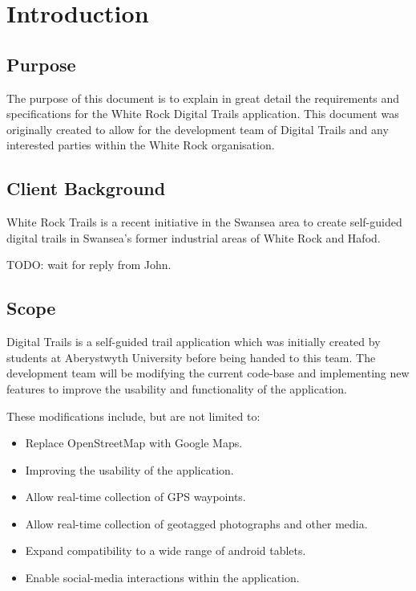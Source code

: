 \documentclass[11pt,a4paper]{article}
\begin{document}


\newpage 

\tableofcontents

\newpage
\section{Introduction}
\subsection{Purpose}
\label{sec:purpose}
The purpose of this document is to explain in great detail the requirements and specifications for the White Rock Digital Trails application. This document was originally created to allow for the development team of Digital Trails and any interested parties within the White Rock organisation.

\subsection{Client Background}
\label{sec:client-background}
White Rock Trails is a recent initiative in the Swansea area to create self-guided digital trails in Swansea's former industrial areas of White Rock and Hafod. 

TODO: wait for reply from John.

\subsection{Scope}
\label{sec:scope}
Digital Trails is a self-guided trail application which was initially created by students at Aberystwyth University before being handed to this team. The development team will be modifying the current code-base and implementing new features to improve the usability and functionality of the application.

These modifications include, but are not limited to:
\begin{itemize}
\item Replace OpenStreetMap with Google Maps.
\item Improving the usability of the application.
\item Allow real-time collection of GPS waypoints.
\item Allow real-time collection of geotagged photographs and other media.
\item Expand compatibility to a wide range of android tablets.
\item Enable social-media interactions within the application.
\end{itemize}
\end{document}
